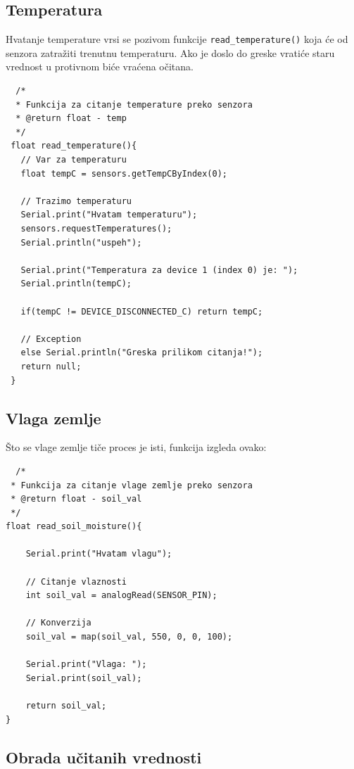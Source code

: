 \documentclass[a4paper,11pt]{book}
\begin{document}
\subsection{Temperatura}

Hvatanje temperature vrsi se pozivom funkcije \verb|read_temperature()| koja će od senzora zatražiti trenutnu temperaturu. Ako je doslo do greske vratiće staru vrednost u protivnom biće vraćena očitana. 

\begin{lstlisting}
  /*
  * Funkcija za citanje temperature preko senzora
  * @return float - temp
  */
 float read_temperature(){
   // Var za temperaturu
   float tempC = sensors.getTempCByIndex(0);
   
   // Trazimo temperaturu
   Serial.print("Hvatam temperaturu");
   sensors.requestTemperatures();
   Serial.println("uspeh");
 
   Serial.print("Temperatura za device 1 (index 0) je: ");
   Serial.println(tempC);
 
   if(tempC != DEVICE_DISCONNECTED_C) return tempC;
 
   // Exception
   else Serial.println("Greska prilikom citanja!");
   return null;
 }
\end{lstlisting}
  
\subsection{Vlaga zemlje}

Što se vlage zemlje tiče proces je isti, funkcija izgleda ovako:

\begin{lstlisting}
  /*
 * Funkcija za citanje vlage zemlje preko senzora
 * @return float - soil_val
 */
float read_soil_moisture(){

	Serial.print("Hvatam vlagu");

	// Citanje vlaznosti
	int soil_val = analogRead(SENSOR_PIN);

	// Konverzija
	soil_val = map(soil_val, 550, 0, 0, 100);

	Serial.print("Vlaga: ");
	Serial.print(soil_val);

	return soil_val;
}
  \end{lstlisting}

  \subsection{Obrada učitanih vrednosti}
\end{document}
